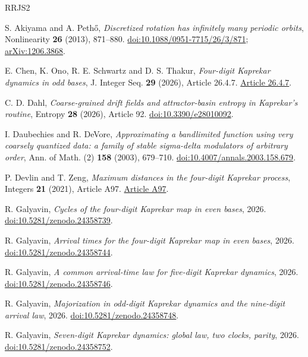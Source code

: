 \documentclass[11pt]{amsart}
\theoremstyle{definition}
\begin{document}
\begin{thebibliography}{RRJS2}
\raggedright
{}
S. Akiyama and A. Peth\H{o},
\emph{Discretized rotation has infinitely many periodic orbits},
Nonlinearity \textbf{26} (2013), 871--880.
\href{https://doi.org/10.1088/0951-7715/26/3/871}{doi:10.1088/0951-7715/26/3/871};
\href{https://arxiv.org/abs/1206.3868}{arXiv:1206.3868}.

E. Chen, K. Ono, R. E. Schwartz and D. S. Thakur,
\emph{Four-digit Kaprekar dynamics in odd bases},
J. Integer Seq. \textbf{29} (2026), Article 26.4.7.
\href{https://cs.uwaterloo.ca/journals/JIS/VOL29/Ono/ono3.pdf}{Article 26.4.7}.

C. D. Dahl, \emph{Coarse-grained drift fields and attractor-basin entropy in Kaprekar's routine},
Entropy \textbf{28} (2026), Article 92.
\href{https://doi.org/10.3390/e28010092}{doi:10.3390/e28010092}.

I. Daubechies and R. DeVore,
\emph{Approximating a bandlimited function using very coarsely quantized data:
a family of stable sigma-delta modulators of arbitrary order},
Ann. of Math. (2) \textbf{158} (2003), 679--710.
\href{https://doi.org/10.4007/annals.2003.158.679}{doi:10.4007/annals.2003.158.679}.

P. Devlin and T. Zeng, \emph{Maximum distances in the four-digit Kaprekar process},
Integers \textbf{21} (2021), Article A97.
\href{https://math.colgate.edu/~integers/v97/v97.pdf}{Article A97}.

R. Galyavin, \emph{Cycles of the four-digit Kaprekar map in even bases}, 2026.
\href{https://doi.org/10.5281/zenodo.24358739}{doi:10.5281/zenodo.24358739}.

R. Galyavin, \emph{Arrival times for the four-digit Kaprekar map in even bases}, 2026.
\href{https://doi.org/10.5281/zenodo.24358744}{doi:10.5281/zenodo.24358744}.

R. Galyavin, \emph{A common arrival-time law for five-digit Kaprekar dynamics}, 2026.
\href{https://doi.org/10.5281/zenodo.24358746}{doi:10.5281/zenodo.24358746}.

R. Galyavin, \emph{Majorization in odd-digit Kaprekar dynamics and the nine-digit arrival law}, 2026.
\href{https://doi.org/10.5281/zenodo.24358748}{doi:10.5281/zenodo.24358748}.

R. Galyavin, \emph{Seven-digit Kaprekar dynamics: global law, two clocks, parity}, 2026.
\href{https://doi.org/10.5281/zenodo.24358752}{doi:10.5281/zenodo.24358752}.


\end{thebibliography}
\end{document}
